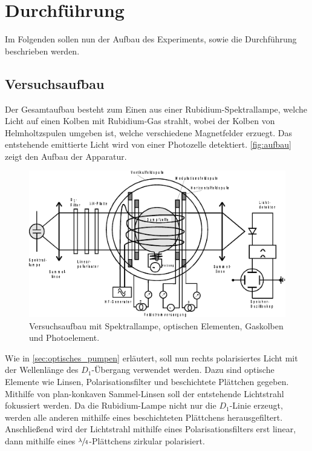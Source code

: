 \section{Durchführung}
\label{sec:durchfuehrung}

    Im Folgenden sollen nun der Aufbau des Experiments,
    sowie die Durchführung beschrieben werden.

\subsection{Versuchsaufbau}

    Der Gesamtaufbau besteht zum Einen aus einer Rubidium-Spektrallampe,
    welche Licht auf einen Kolben mit Rubidium-Gas strahlt,
    wobei der Kolben von Helmholtzspulen umgeben ist,
    welche verschiedene Magnetfelder erzuegt.
    Das entstehende emittierte Licht wird von einer Photozelle detektiert.
    \autoref{fig:aufbau} zeigt den Aufbau der Apparatur.
    \begin{figure}
        \centering
        \includegraphics[width=\textwidth]{content/img/Abb_1.pdf}
        \caption{Versuchsaufbau mit Spektrallampe, optischen Elementen, Gaskolben und Photoelement. \cite{versuchsanleitung}}
        \label{fig:aufbau}
    \end{figure}

    Wie in \autoref{sec:optisches_pumpen} erläutert,
    soll nun rechts polarisiertes Licht mit der Wellenlänge des $D_1$-Übergang verwendet werden.
    Dazu sind optische Elemente wie Linsen,
    Polarisationsfilter und beschichtete Plättchen gegeben.
    Mithilfe von plan-konkaven Sammel-Linsen soll der entstehende Lichtstrahl fokussiert werden.
    Da die Rubidium-Lampe nicht nur die $D_1$-Linie erzeugt,
    werden alle anderen mithilfe eines beschichteten Plättchens herausgefiltert.
    Anschließend wird der Lichtstrahl mithilfe eines Polarisationsfilters erst linear,
    dann mithilfe eines $\sfrac{\lambda}{4}$-Plättchens zirkular polarisiert.

